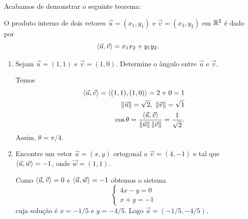 Acabamos de demonstrar o seguinte teorema:
\begin{teorema}
    O produto interno de dois vetores $\vec{u} = (x_1, y_1)$ e $\vec{v} = (x_2, y_2)$ em $\mathbb{R}^2$ é dado por
    \[
        \langle \vec{u}, \vec{v} \rangle = x_1x_2 + y_1y_2.
    \]
\end{teorema}

\begin{exemplos}
    \begin{enumerate}
        \item Sejam $\vec{u} = (1, 1)$ e $\vec{v} = (1,0)$. Determine o ângulo entre $\vec{u}$ e $\vec{v}$.
              \begin{solucao}
                  Temos
                  \begin{align*}
                      \langle \vec{u}, \vec{v} \rangle = \langle (1, 1), (1,0)\rangle = 2 + 0 = 1 \\
                      \left\Vert{\vec{u}}\right\Vert = \sqrt{2},\ \left\Vert{\vec{v}}\right\Vert = \sqrt{1}   \\
                      \cos\theta = \frac{\langle \vec{u}, \vec{v} \rangle}{\left\Vert{\vec{u}}\right\Vert\left\Vert{\vec{v}}\right\Vert} = \dfrac{1}{\sqrt{2}}.
                  \end{align*}
                  Assim, $\theta = \pi/4$.
              \end{solucao}
        \item Encontre um vetor $\vec{u} = (x, y)$ ortogonal a $\vec{v} = (4, -1)$ e tal que $\langle \vec{u}, \vec{w} \rangle = -1$, onde $\vec{w} = (1,1)$.
              \begin{solucao}
                  Como $\langle \vec{u}, \vec{v} \rangle = 0$ e $\langle \vec{u}, \vec{w} \rangle = -1$ obtemos o sistema
                  \[
                      \begin{cases}
                          4x - y = 0 \\
                          x + y = -1
                      \end{cases}
                  \]
                  cuja solução é $x = -1/5$ e $y = -4/5$. Logo $\vec{u} = (-1/5, -4/5)$.
              \end{solucao}
    \end{enumerate}
\end{exemplos}

